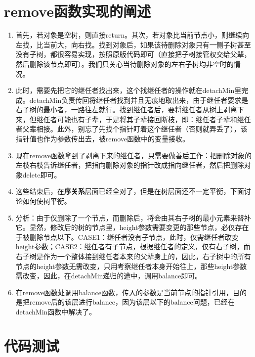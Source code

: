 \documentclass[UTF8]{ctexart}
\begin{document}
\pagestyle{fancy}
\fancyhead{}

\section{remove函数实现的阐述}

\begin{enumerate}
  \item 首先，若对象是空树，则直接return。其次，若对象比当前节点小，则继续向左找，比当前大，向右找。找到对象后，如果该待删除对象只有一侧子树甚至没有子树，都很容易实现，按照原版代码即可（直接把子树接管权交给父辈，然后删除该节点即可）。我们只关心当待删除对象的左右子树均非空时的情况。

  \item 此时，需要先把它的继任者找出来，这个找继任者的操作就在detachMin里完成。detachMin负责传回将继任者找到并且无痕地取出来，由于继任者要求是右子树的最小者，一路往左就行。找到继任者后，要将继任者从树上剥离下来，但继任者可能也有子辈，于是将其子辈接回断枝，即：继任者子辈和继任者父辈相接。此外，别忘了先找个指针盯着这个继任者（否则就弄丢了），该指针值也作为参数传出去，被remove函数中的变量接收。\

  \item 现在remove函数拿到了剥离下来的继任者，只需要做善后工作：把删除对象的左枝右枝告诉继任者，把指向删除对象的指针改成指向继任者，然后把删除对象delete即可。\

  \item 这些结束后，在\textbf{序关系}层面已经全对了，但是在树层面还不一定平衡，下面讨论如何使树平衡。\

  \item 分析：由于仅删除了一个节点，而删除后，将会由其右子树的最小元素来替补它。显然，修改后的树的节点里，height参数需要变更的那些节点，必仅存在于被删除节点以下。CASE1：继任者没有子节点，此时，仅需继任者改变height参数；CASE2：继任者有子节点，根据继任者的定义，仅有右子树，而右子树是作为一个整体接到继任者本来的父辈身上的，因此，右子树中的所有节点的height参数无需改变，只用考察继任者本身开始往上，那些height参数需改变，因此，在detachMin递归的途中，调用balance即可。\

  \item 在remove函数处调用balance函数，传入的参数是当前节点的指针引用，目的是把remove后的该层进行balance，因为该层以下的balance问题，已经在detachMin函数中解决了。\

\end{enumerate}

\section{代码测试}
\end{document}
